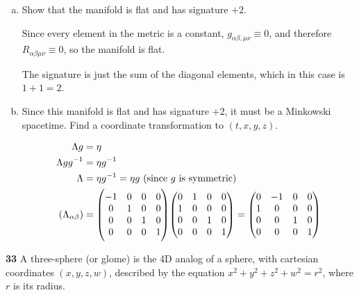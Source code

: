 \documentclass[gr-notes.tex]{subfiles}
\begin{document}
\begin{enumerate}[(a)]
\item Show that the manifold is flat and has signature $+2$.

Since every element in the metric is a constant, $g_{\alpha\beta,\mu\nu} \equiv 0$, and therefore $R_{\alpha\beta\mu\nu} \equiv 0$, so the manifold is flat.

The signature is just the sum of the diagonal elements, which in this case is $1 + 1 = 2$.

\item Since this manifold is flat and has signature $+2$, it must be a Minkowski spacetime. Find a coordinate transformation to $(t,x,y,z)$.

\begin{align*}
  \Lambda g &= \eta
  \\
  \Lambda g g^{-1} &= \eta g^{-1}
  \\
  \Lambda &= \eta g^{-1} = \eta g
  \text{ (since $g$ is symmetric)}
  \\
  (\Lambda_{\alpha\beta}) &=
  \mqty(\dmat[0]{-1,1,1,1})
  \mqty( 0 & 1 & 0 & 0 \\
         1 & 0 & 0 & 0 \\
         0 & 0 & 1 & 0 \\
         0 & 0 & 0 & 1 ) =
  \mqty( 0 & -1 & 0 & 0 \\
         1 &  0 & 0 & 0 \\
         0 &  0 & 1 & 0 \\
         0 &  0 & 0 & 1 )
\end{align*}

\end{enumerate}


\textbf{33}
A three-sphere (or glome) is the 4D analog of a sphere, with cartesian coordinates $(x,y,z,w)$, described by the equation $x^2+y^2+z^2+w^2=r^2$, where $r$ is its radius.
\end{document}
